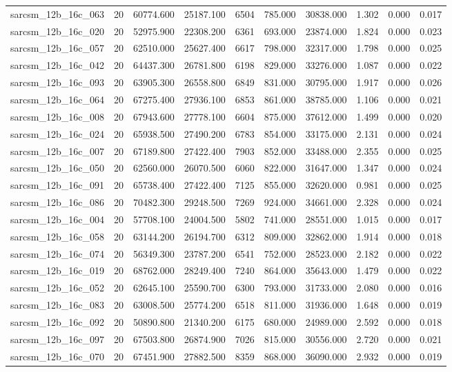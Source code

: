 \begin{tabular}{lrrrrrrrrr}
sarcsm\_12b\_16c\_063 & 20 & 60774.600 & 25187.100 & 6504 & 785.000 & 30838.000 & 1.302 & 0.000 & 0.017 \\
sarcsm\_12b\_16c\_020 & 20 & 52975.900 & 22308.200 & 6361 & 693.000 & 23874.000 & 1.824 & 0.000 & 0.023 \\
sarcsm\_12b\_16c\_057 & 20 & 62510.000 & 25627.400 & 6617 & 798.000 & 32317.000 & 1.798 & 0.000 & 0.025 \\
sarcsm\_12b\_16c\_042 & 20 & 64437.300 & 26781.800 & 6198 & 829.000 & 33276.000 & 1.087 & 0.000 & 0.022 \\
sarcsm\_12b\_16c\_093 & 20 & 63905.300 & 26558.800 & 6849 & 831.000 & 30795.000 & 1.917 & 0.000 & 0.026 \\
sarcsm\_12b\_16c\_064 & 20 & 67275.400 & 27936.100 & 6853 & 861.000 & 38785.000 & 1.106 & 0.000 & 0.021 \\
sarcsm\_12b\_16c\_008 & 20 & 67943.600 & 27778.100 & 6604 & 875.000 & 37612.000 & 1.499 & 0.000 & 0.020 \\
sarcsm\_12b\_16c\_024 & 20 & 65938.500 & 27490.200 & 6783 & 854.000 & 33175.000 & 2.131 & 0.000 & 0.024 \\
sarcsm\_12b\_16c\_007 & 20 & 67189.800 & 27422.400 & 7903 & 852.000 & 33488.000 & 2.355 & 0.000 & 0.025 \\
sarcsm\_12b\_16c\_050 & 20 & 62560.000 & 26070.500 & 6060 & 822.000 & 31647.000 & 1.347 & 0.000 & 0.024 \\
sarcsm\_12b\_16c\_091 & 20 & 65738.400 & 27422.400 & 7125 & 855.000 & 32620.000 & 0.981 & 0.000 & 0.025 \\
sarcsm\_12b\_16c\_086 & 20 & 70482.300 & 29248.500 & 7269 & 924.000 & 34661.000 & 2.328 & 0.000 & 0.024 \\
sarcsm\_12b\_16c\_004 & 20 & 57708.100 & 24004.500 & 5802 & 741.000 & 28551.000 & 1.015 & 0.000 & 0.017 \\
sarcsm\_12b\_16c\_058 & 20 & 63144.200 & 26194.700 & 6312 & 809.000 & 32862.000 & 1.914 & 0.000 & 0.018 \\
sarcsm\_12b\_16c\_074 & 20 & 56349.300 & 23787.200 & 6541 & 752.000 & 28523.000 & 2.182 & 0.000 & 0.022 \\
sarcsm\_12b\_16c\_019 & 20 & 68762.000 & 28249.400 & 7240 & 864.000 & 35643.000 & 1.479 & 0.000 & 0.022 \\
sarcsm\_12b\_16c\_052 & 20 & 62645.100 & 25590.700 & 6300 & 793.000 & 31733.000 & 2.080 & 0.000 & 0.016 \\
sarcsm\_12b\_16c\_083 & 20 & 63008.500 & 25774.200 & 6518 & 811.000 & 31936.000 & 1.648 & 0.000 & 0.019 \\
sarcsm\_12b\_16c\_092 & 20 & 50890.800 & 21340.200 & 6175 & 680.000 & 24989.000 & 2.592 & 0.000 & 0.018 \\
sarcsm\_12b\_16c\_097 & 20 & 67503.800 & 26874.900 & 7026 & 815.000 & 30556.000 & 2.720 & 0.000 & 0.021 \\
sarcsm\_12b\_16c\_070 & 20 & 67451.900 & 27882.500 & 8359 & 868.000 & 36090.000 & 2.932 & 0.000 & 0.019 \\
\bottomrule
\end{tabular}
